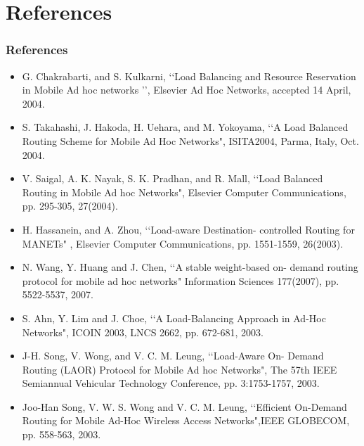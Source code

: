 \documentclass[]{beamer}
\begin{document}
\section{References}
\begin{frame}
\frametitle{References}
\begin{itemize}

\item G. Chakrabarti, and S. Kulkarni, \lq\lq Load Balancing and Resource Reservation in Mobile Ad hoc networks \rq\rq, Elsevier Ad Hoc Networks, accepted 14 April, 2004.

\item S. Takahashi, J. Hakoda, H. Uehara, and M. Yokoyama, \lq\lq A Load Balanced Routing Scheme for Mobile Ad Hoc Networks", ISITA2004, Parma, Italy, Oct. 2004.

\item V. Saigal, A. K. Nayak, S. K. Pradhan, and R. Mall, \lq\lq Load Balanced Routing in Mobile Ad hoc Networks", Elsevier Computer Communications, pp. 295-305, 27(2004).

\item H. Hassanein, and A. Zhou, \lq\lq Load-aware Destination- controlled Routing for MANETs" , Elsevier Computer Communications, pp. 1551-1559, 26(2003).
\end{itemize}
\end{frame}

\begin{frame}
\begin{itemize}
\item N. Wang, Y. Huang and J. Chen, \lq\lq A stable weight-based on- demand routing protocol for mobile ad hoc networks" Information Sciences 177(2007), pp. 5522-5537, 2007.

\item S. Ahn, Y. Lim and J. Choe, \lq\lq A Load-Balancing Approach in Ad-Hoc Networks", ICOIN 2003, LNCS 2662, pp. 672-681, 2003.

\item J-H. Song, V. Wong, and V. C. M. Leung, \lq\lq Load-Aware On- Demand Routing (LAOR) Protocol for Mobile Ad hoc Networks", The 57th IEEE Semiannual Vehicular Technology Conference, pp. 3:1753-1757, 2003.

\item Joo-Han Song, V. W. S. Wong and V. C. M. Leung, \lq\lq Efficient On-Demand Routing for Mobile Ad-Hoc Wireless Access Networks",IEEE GLOBECOM, pp. 558-563, 2003.
\end{itemize}
\end{frame}
\end{document}
